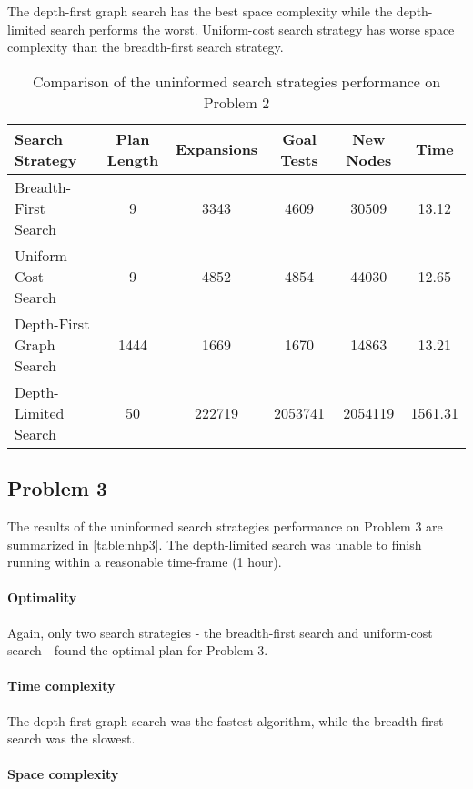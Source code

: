 \documentclass[11pt]{article}
\begin{document}
The depth-first graph search has the best space complexity while the depth-limited search performs the worst. Uniform-cost search strategy has worse space complexity than the breadth-first search strategy.

\begin{table}[H]
  \centering
  \caption{Comparison of the uninformed search strategies performance on Problem 2}
  \bigskip
  \label{table:nhp2}
  \bgroup
  \def\arraystretch{1.5}
  \begin{tabular}{l|c|c|c|c|c}
    Search Strategy & Plan Length & Expansions & Goal Tests & New Nodes & Time \\
    \hline
    Breadth-First Search & 9 & 3343 & 4609 & 30509 & 13.12 \\
    Uniform-Cost Search & 9 & 4852 & 4854 & 44030 & 12.65 \\
    Depth-First Graph Search & 1444 & 1669 & 1670 & 14863 & 13.21 \\
    Depth-Limited Search & 50 & 222719 & 2053741 & 2054119 & 1561.31 \\
  \end{tabular}
  \egroup
\end{table}

\subsection{Problem 3}

The results of the uninformed search strategies performance on Problem 3 are summarized in \ref{table:nhp3}. The depth-limited search was unable to finish running within a reasonable time-frame (1 hour).

\paragraph{Optimality}

Again, only two search strategies - the breadth-first search and uniform-cost search - found the optimal plan for Problem 3.

\paragraph{Time complexity}

The depth-first graph search was the fastest algorithm, while the breadth-first search was the slowest.

\paragraph{Space complexity}
\end{document}
